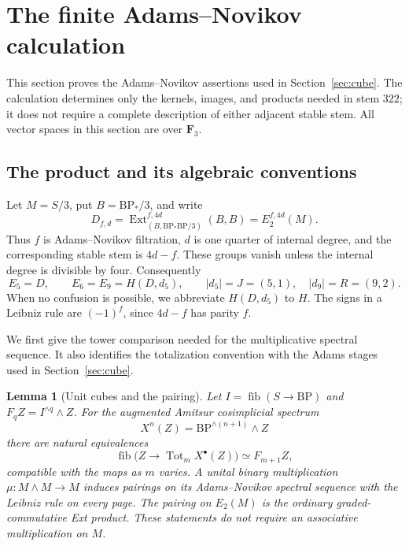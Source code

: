\documentclass[11pt]{article}
\newtheorem{lemma}[theorem]{Lemma}
\theoremstyle{definition}
\theoremstyle{remark}
\numberwithin{equation}{section}
\begin{document}
\section{The finite Adams--Novikov calculation}\label{sec:finite}

This section proves the Adams--Novikov assertions used in
Section~\ref{sec:cube}.  The calculation determines only the kernels,
images, and products needed in stem $322$; it does not require a complete
description of either adjacent stable stem.  All vector spaces in this
section are over $\mathbf F_3$.

\subsection{The product and its algebraic conventions}

Let $M=S/3$, put $B=\mathrm{BP}_*/3$, and write
\[
 D_{f,d}=\operatorname{Ext}^{f,4d}_{(B,\mathrm{BP}_*\mathrm{BP}/3)}(B,B)=E_2^{f,4d}(M).
\]
Thus $f$ is Adams--Novikov filtration, $d$ is one quarter of internal degree, and
the corresponding stable stem is $4d-f$.  These groups vanish unless the
internal degree is divisible by four.  Consequently
\[
 E_5=D,\qquad E_6=E_9=H(D,d_5),\qquad
 |d_5|=J=(5,1),\quad |d_9|=R=(9,2).
\]
When no confusion is possible, we abbreviate $H(D,d_5)$ to $H$.
The signs in a Leibniz rule are $(-1)^f$, since $4d-f$ has parity $f$.

We first give the tower comparison needed for the multiplicative
spectral sequence.  It also identifies the totalization convention
with the Adams stages used in Section~\ref{sec:cube}.

\begin{lemma}[Unit cubes and the pairing]\label{finite:pairing}
Let $I=\operatorname{fib}(S\longrightarrow\mathrm{BP})$ and
$F_qZ=I^{\wedge q}\wedge Z$.  For the augmented Amitsur cosimplicial
spectrum
\[
 X^n(Z)=\mathrm{BP}^{\wedge(n+1)}\wedge Z
\]
there are natural equivalences
\[
 \operatorname{fib}\bigl(Z\longrightarrow\operatorname{Tot}_m X^\bullet(Z)\bigr)
 \simeq F_{m+1}Z,
\]
compatible with the maps as $m$ varies.  A unital binary multiplication
$\mu\colon M\wedge M\longrightarrow M$ induces pairings on its
Adams--Novikov spectral sequence with the Leibniz rule on every page.
The pairing on $E_2(M)$ is the ordinary graded-commutative Ext product.
These statements do not require an associative multiplication on $M$.
\end{lemma}
\end{document}
